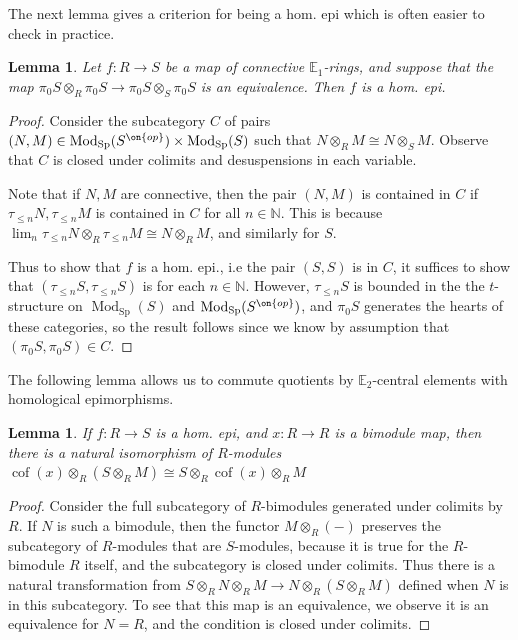 \documentclass[12 pt]{amsart}
\theoremstyle{plain}
\newtheorem{lemma}[theorem]{Lemma}
\theoremstyle{definition}
\theoremstyle{remark}
\numberwithin{equation}{section}
\DeclareMathOperator\Sp{Sp}
\DeclareMathOperator\cof{cof}
\DeclareMathOperator\Mod{Mod}
\newcommand\NN{\mathbb{N}}
\newcommand\EE{\mathbb{E}}
\begin{document}
The next lemma gives a criterion for being a hom. epi which is often easier to check in practice.
\begin{lemma}\label{lemma:homepipi0}
	Let $f:R \to S$ be a map of connective $\EE_1$-rings, and suppose that the map $\pi_0S\otimes_R\pi_0S \to \pi_0S\otimes_S\pi_0S$ is an equivalence. Then $f$ is a hom. epi.
\end{lemma}

\begin{proof}
	Consider the subcategory $C$ of pairs $(N,M)
	\in\Mod_{\Sp}(S^{\on{op}})\times\Mod_{\Sp}(S)$ such that $N\otimes_RM
	\cong N\otimes_SM$. Observe that $C$ is closed under colimits and desuspensions in each variable.
	
	Note that if $N,M$ are connective, then the pair $(N,M)$ is contained in
	$C$ if $\tau_{\leq n}N,\tau_{\leq n}M$ is contained in $C$ for all $n\in\NN$. This is because $\lim_n\tau_{\leq n}N\otimes_R\tau_{\leq n}M\cong N\otimes_RM$, and similarly for $S$.
	
	Thus to show that $f$ is a hom. epi., i.e the pair $(S,S)$ is in $C$, it
	suffices to show that $(\tau_{\leq n}S,\tau_{\leq n}S)$ is for each
	$n\in\NN$. However, $\tau_{\leq n}S$ is bounded in the the $t$-structure on $\Mod_{\Sp}(S)$ 
	and
	$\Mod_{\Sp}(S^{\on{op}})$, and $\pi_0S$ generates the hearts of these categories, so the result follows since we know by assumption that $(\pi_0S,\pi_0S) \in C$.
\end{proof}

The following lemma allows us to commute quotients by $\EE_2$-central elements with homological epimorphisms.
\begin{lemma}\label{lemma:e2centralhomepi}
	If $f:R \to S$ is a hom. epi, 
	and $x:R \to R$ is a bimodule map, then there is a natural isomorphism of $R$-modules $\cof(x)\otimes_R(S\otimes_RM) \cong S\otimes_R\cof(x)\otimes_RM$
\end{lemma}

\begin{proof}
	Consider the full subcategory of $R$-bimodules generated under colimits by $R$. 
	If $N$ is such a bimodule, then
	the functor $M\otimes_R(-)$ preserves the subcategory of $R$-modules that are $S$-modules, because it is true for the $R$-bimodule $R$ itself, and the subcategory is closed under colimits. Thus there is a natural transformation from $S\otimes_RN\otimes_RM \to N\otimes_R(S\otimes_RM)$ defined when $N$ is in this subcategory. To see that this map is an equivalence, we observe it is an equivalence for $N=R$, and the condition is closed under colimits.
\end{proof}
\end{document}
